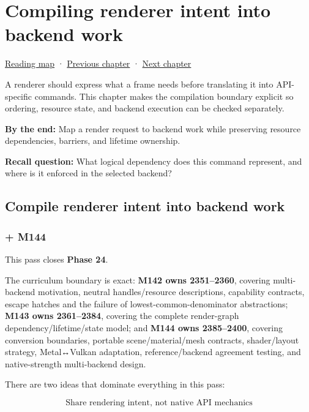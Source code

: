 \hypertarget{06-engine-ii-ch043}{}
\chapter{Compiling renderer intent into backend work}\label{06-engine-ii-ch043-compiling-renderer-intent-into-backend-work}

\hyperref[volume-reading-map]{Reading map} · \hyperref[06-engine-ii-ch042-from-cartridge-bytes-to-a-reproducible-machine]{Previous chapter} · \hyperref[06-engine-ii-ch044-cross-backend-conversion-and-agreement]{Next chapter}

A renderer should express what a frame needs before translating it into API-specific commands. This chapter makes the compilation boundary explicit so ordering, resource state, and backend execution can be checked separately.

\textbf{By the end:} Map a render request to backend work while preserving resource dependencies, barriers, and lifetime ownership.

\textbf{Recall question:} What logical dependency does this command represent, and where is it enforced in the selected backend?

\section{Compile renderer intent into backend work}\label{06-engine-ii-ch043-compile-renderer-intent-into-backend-work}

\subsection{+ M144}\label{06-engine-ii-ch043-m144}

This pass closes \textbf{Phase 24}.

The curriculum boundary is exact: \textbf{M142 owns 2351--2360}, covering multi-backend motivation, neutral handles/resource descriptions, capability contracts, escape hatches and the failure of lowest-common-denominator abstractions; \textbf{M143 owns 2361--2384}, covering the complete render-graph dependency/lifetime/state model; and \textbf{M144 owns 2385--2400}, covering conversion boundaries, portable scene/material/mesh contracts, shader/layout strategy, Metal↔Vulkan adaptation, reference/backend agreement testing, and native-strength multi-backend design.

There are two ideas that dominate everything in this pass:

\[
\boxed{
\text{Share rendering intent, not native API mechanics}
}
\]

